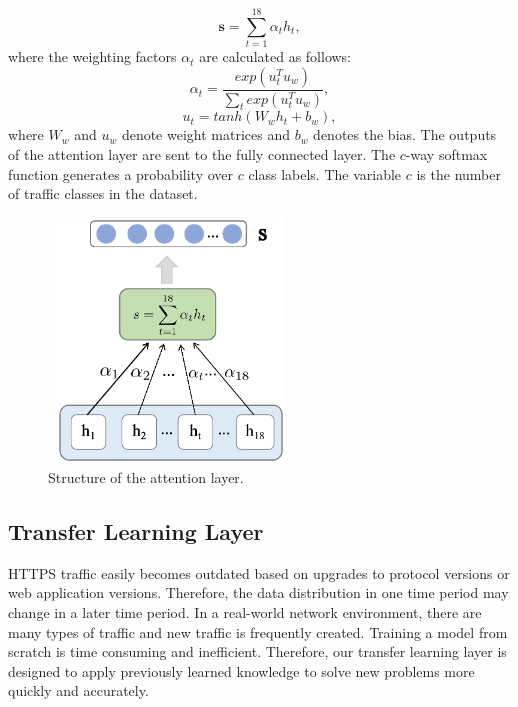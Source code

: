 \documentclass[preprint,12pt]{elsarticle}
\begin{document}
\begin{equation}
    \bm{s} = \sum_{t=1}^{18} \alpha{_t}h_t,
\end{equation}
where the weighting factors $\alpha{_t}$ are calculated as follows:
\begin{equation}
    \alpha{_t} = \frac{exp(u_t^{T}u_w)}{\sum_{t} exp(u_t^{T}u_w)},
\end{equation}
\begin{equation}
    u_t = tanh(W_wh_t + b_w),
\end{equation}
where $W_w$ and $u_w$ denote weight matrices and $b_w$ denotes the bias. The outputs of the attention layer are sent to the fully connected layer. The $c$-way softmax function generates a probability over $c$ class labels. The variable $c$ is the number of traffic classes in the dataset.

\begin{figure}[]
\centerline{\includegraphics[width=6.5cm,height=6.5cm]{attention_layer.eps}}
\caption{Structure of the attention layer.}\label{fig12}
\end{figure}
\subsection{Transfer Learning Layer}

HTTPS traffic easily becomes outdated based on upgrades to protocol versions or web application versions. Therefore, the data distribution in one time period may change in a later time period. In a real-world network environment, there are many types of traffic and new traffic is frequently created. Training a model from scratch is time consuming and inefficient. Therefore, our transfer learning layer is designed to apply previously learned knowledge to solve new problems more quickly and accurately.
\end{document}

